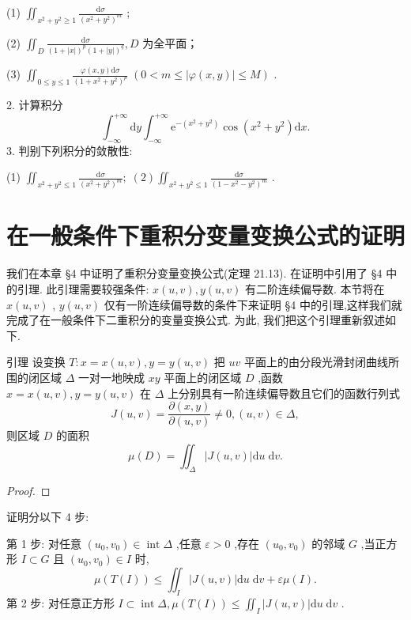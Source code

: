 (1) \({\iint }_{{x}^{2} + {y}^{2} \geq  1}\frac{\mathrm{d}\sigma }{{\left( {x}^{2} + {y}^{2}\right) }^{m}}\) ;

(2) \({\iint }_{D}\frac{\mathrm{d}\sigma }{{\left( 1 + \left| x\right| \right) }^{p}{\left( 1 + \left| y\right| \right) }^{q}},D\) 为全平面；

(3) \({\iint }_{0 \leq  y \leq  1}\frac{\varphi \left( {x,y}\right) \mathrm{d}\sigma }{{\left( 1 + {x}^{2} + {y}^{2}\right) }^{p}}\;\left( {0 < m \leq  \left| {\varphi \left( {x,y}\right) }\right|  \leq  M}\right)\) .

2. 计算积分
\[
{\int }_{-\infty }^{+\infty }\mathrm{d}y{\int }_{-\infty }^{+\infty }{\mathrm{e}}^{-\left( {{x}^{2} + {y}^{2}}\right) }\cos \left( {{x}^{2} + {y}^{2}}\right) \mathrm{d}x.
\]
3. 判别下列积分的敛散性:

(1) \({\iint }_{{x}^{2} + {y}^{2} \leq  1}\frac{\mathrm{d}\sigma }{{\left( {x}^{2} + {y}^{2}\right) }^{m}};\;\left( 2\right) {\iint }_{{x}^{2} + {y}^{2} \leq  1}\frac{\mathrm{d}\sigma }{{\left( 1 - {x}^{2} - {y}^{2}\right) }^{m}}\) .

\section{在一般条件下重积分变量变换公式的证明}

我们在本章 §4 中证明了重积分变量变换公式(定理 21.13). 在证明中引用了 §4 中的引理. 此引理需要较强条件: \(x\left( {u,v}\right) ,y\left( {u,v}\right)\) 有二阶连续偏导数. 本节将在 \(x\left( {u,v}\right)\) , \(y\left( {u,v}\right)\) 仅有一阶连续偏导数的条件下来证明 §4 中的引理,这样我们就完成了在一般条件下二重积分的变量变换公式. 为此, 我们把这个引理重新叙述如下.

引理 设变换 \(T : x = x\left( {u,v}\right) ,y = y\left( {u,v}\right)\) 把 \({uv}\) 平面上的由分段光滑封闭曲线所围的闭区域 \(\Delta\) 一对一地映成 \({xy}\) 平面上的闭区域 \(D\) ,函数 \(x = x\left( {u,v}\right) ,y = y\left( {u,v}\right)\) 在 \(\Delta\) 上分别具有一阶连续偏导数且它们的函数行列式
\[
J\left( {u,v}\right)  = \frac{\partial \left( {x,y}\right) }{\partial \left( {u,v}\right) } \neq  0,\left( {u,v}\right)  \in  \Delta ,
\]
则区域 \(D\) 的面积
\[
\mu \left( D\right)  = {\iint }_{\Delta }\left| {J\left( {u,v}\right) }\right| \mathrm{d}u\mathrm{\;d}v.
\]
\begin{proof}

\end{proof}
证明分以下 4 步:

第 1 步: 对任意 \(\left( {{u}_{0},{v}_{0}}\right)  \in  \operatorname{int}\Delta\) ,任意 \(\varepsilon  > 0\) ,存在 \(\left( {{u}_{0},{v}_{0}}\right)\) 的邻域 \(G\) ,当正方形 \(I \subset  G\) 且 \(\left( {{u}_{0},{v}_{0}}\right)  \in  I\) 时,
\[
\mu \left( {T\left( I\right) }\right)  \leq  {\iint }_{I}\left| {J\left( {u,v}\right) }\right| \mathrm{d}u\mathrm{\;d}v + {\varepsilon \mu }\left( I\right) .
\]
第 2 步: 对任意正方形 \(I \subset  \operatorname{int}\Delta ,\mu \left( {T\left( I\right) }\right)  \leq  {\iint }_{I}\left| {J\left( {u,v}\right) }\right| \mathrm{d}u\mathrm{\;d}v\) .

